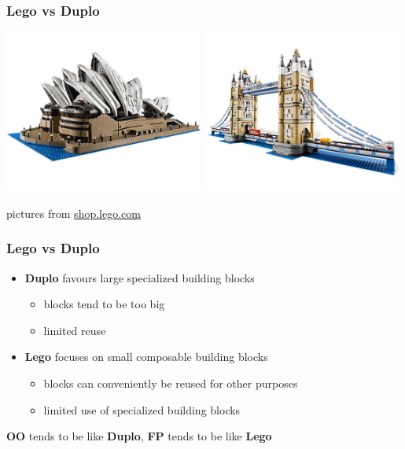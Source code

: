 \documentclass{beamer}
\begin{document}
\begin{frame}
  \frametitle{Lego vs Duplo}
  \begin{center}
    \includegraphics[width=0.49\textwidth]{../images/lego-sydney-opera.jpg}
    \includegraphics[width=0.49\textwidth]{../images/lego-tower-bridge.jpg}
  \end{center}
  \vfill
  \begin{center}
    {\tiny pictures from \url{shop.lego.com}}
  \end{center}
\end{frame}

\begin{frame}
  \frametitle{Lego vs Duplo}
  \begin{itemize}
  \item<1-> \textbf{Duplo} favours large specialized building blocks
    \begin{itemize}
    \item<1-> blocks tend to be too big
    \item<1-> limited reuse
    \end{itemize}
  \item<2-> \textbf{Lego} focuses on small composable building blocks
    \begin{itemize}
    \item<2-> blocks can conveniently be reused for other purposes
    \item<2-> limited use of specialized building blocks
    \end{itemize}
  \end{itemize}
  \vfill
  \begin{center}
    \textbf{OO} tends to be like \textbf{Duplo}, \textbf{FP} tends to
    be like \textbf{Lego}
  \end{center}

\end{frame}
\end{document}
